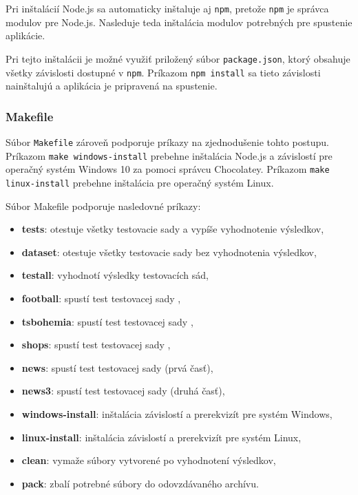 Pri inštalácií Node.js sa automaticky inštaluje aj \texttt{npm}, pretože \texttt{npm} je správca modulov pre Node.js. Nasleduje teda inštalácia modulov potrebných pre spustenie aplikácie.

Pri tejto inštalácii je možné využiť priložený súbor \texttt{package.json}, ktorý obsahuje všetky závislosti dostupné v \texttt{npm}. Príkazom \texttt{npm install} sa tieto závislosti nainštalujú a aplikácia je pripravená na spustenie.

\newpage

\subsubsection{Makefile}

Súbor \texttt{Makefile} zároveň podporuje príkazy na zjednodušenie tohto postupu. Príkazom \texttt{make windows-install} prebehne inštalácia Node.js a závislostí pre operačný systém Windows 10 za pomoci správcu Chocolatey. Príkazom \texttt{make linux-install} prebehne inštalácia pre operačný systém Linux.

Súbor Makefile podporuje nasledovné príkazy:

\begin{itemize}
    \item \textbf{tests}: otestuje všetky testovacie sady a vypíše vyhodnotenie výsledkov,
    \item \textbf{dataset}: otestuje všetky testovacie sady bez vyhodnotenia výsledkov,
    \item \textbf{testall}: vyhodnotí výsledky testovacích sád,
    \item \textbf{football}: spustí test testovacej sady ,
    \item \textbf{tsbohemia}: spustí test testovacej sady ,
    \item \textbf{shops}: spustí test testovacej sady ,
    \item \textbf{news}: spustí test testovacej sady  (prvá časť),
    \item \textbf{news3}: spustí test testovacej sady  (druhá časť),
    \item \textbf{windows-install}: inštalácia závislostí a prerekvizít pre systém Windows,
    \item \textbf{linux-install}: inštalácia závislostí a prerekvizít pre systém Linux,
    \item \textbf{clean}: vymaže súbory vytvorené po vyhodnotení výsledkov,
    \item \textbf{pack}: zbalí potrebné súbory do odovzdávaného archívu.
\end{itemize}

